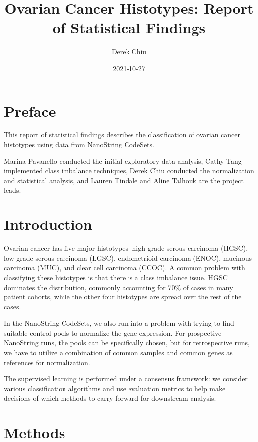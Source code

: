 \documentclass[
]{report}
\title{Ovarian Cancer Histotypes: Report of Statistical Findings}
\author{Derek Chiu}
\date{2021-10-27}
\begin{document}
\maketitle

{
\hypersetup{linkcolor=}
\setcounter{tocdepth}{1}
\tableofcontents
}
\listoffigures
\listoftables
\hypertarget{preface}{%
\chapter*{Preface}\label{preface}}

This report of statistical findings describes the classification of ovarian cancer histotypes using data from NanoString CodeSets.

Marina Pavanello conducted the initial exploratory data analysis, Cathy Tang implemented class imbalance techniques, Derek Chiu conducted the normalization and statistical analysis, and Lauren Tindale and Aline Talhouk are the project leads.

\hypertarget{introduction}{%
\chapter{Introduction}\label{introduction}}

Ovarian cancer has five major histotypes: high-grade serous carcinoma (HGSC), low-grade serous carcinoma (LGSC), endometrioid carcinoma (ENOC), mucinous carcinoma (MUC), and clear cell carcinoma (CCOC). A common problem with classifying these histotypes is that there is a class imbalance issue. HGSC dominates the distribution, commonly accounting for 70\% of cases in many patient cohorts, while the other four histotypes are spread over the rest of the cases.

In the NanoString CodeSets, we also run into a problem with trying to find suitable control pools to normalize the gene expression. For prospective NanoString runs, the pools can be specifically chosen, but for retrospective runs, we have to utilize a combination of common samples and common genes as references for normalization.

The supervised learning is performed under a consensus framework: we consider various classification algorithms and use evaluation metrics to help make decisions of which methods to carry forward for downstream analysis.

\hypertarget{methods}{%
\chapter{Methods}\label{methods}}
\end{document}
